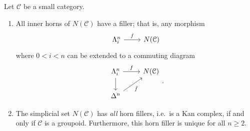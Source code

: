 \documentclass[main.tex]{subfiles}
\begin{document}
\begin{proposition}
  \label{prop:horn_fillers_in_nerve}
  Let $\mathcal{C}$ be a small category.
  \begin{enumerate}
    \item All inner horns of $N(\mathcal{C})$ have a filler; that is, any morphism
      \begin{equation*}
        \begin{tikzcd}
          \Lambda^{n}_{i}
          \arrow[r, "f"]
          & N(\mathcal{C})
        \end{tikzcd}
      \end{equation*}
      where $0 < i < n$ can be extended to a commuting diagram
      \begin{equation*}
        \begin{tikzcd}
          \Lambda^{n}_{i}
          \arrow[r, "f"]
          \arrow[d]
          & N(\mathcal{C})
          \\
          \Delta^{n}
          \arrow[ur, swap, "\bar{f}"]
        \end{tikzcd}.
      \end{equation*}

    \item The simplicial set $N(\mathcal{C})$ has \emph{all} horn fillers, i.e.\ is a Kan complex, if and only if $\mathcal{C}$ is a groupoid. Furthermore, this horn filler is unique for all $n \geq 2$.
  \end{enumerate}
\end{proposition}
\end{document}
